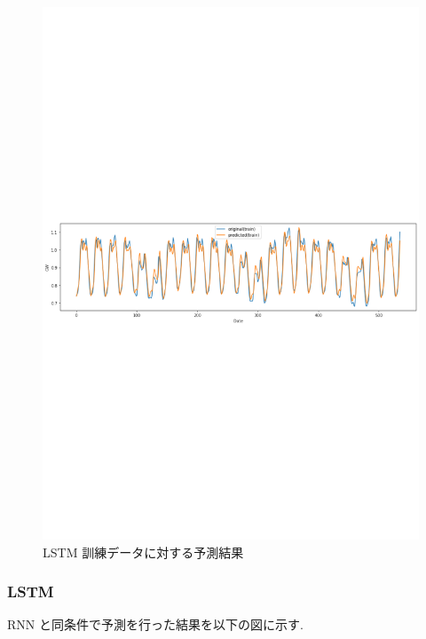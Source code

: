 \begin{figure}[b]
\begin{center}
\includegraphics[scale=0.6]{lstm_pred_month.pdf}
\end{center}
\vspace{-80mm}
\caption{LSTM 訓練データに対する予測結果}
\end{figure}

\subsubsection{LSTM}
RNN と同条件で予測を行った結果を以下の図に示す.

